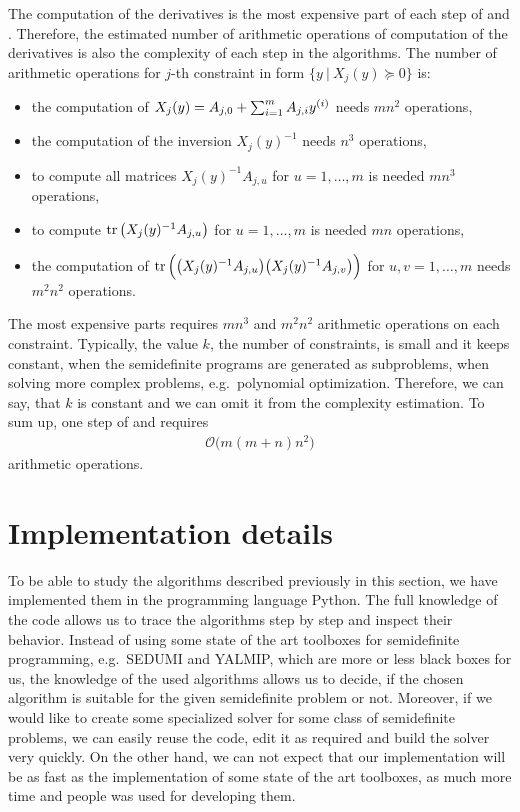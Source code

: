 The computation of the derivatives is the most expensive part of each step of  and .
Therefore, the estimated number of arithmetic operations of computation of the derivatives is also the complexity of each step in the algorithms.
The number of arithmetic operations for $j$-th constraint in form $\big\{y\ |\ X_j(y) \succeq 0\big\}$ is:
\begin{itemize}
  \item the computation of $X_j(y) = A_{j,0} + \sum_{i=1}^mA_{j,i}y^{(i)}$ needs $mn^2$ operations,
  \item the computation of the inversion $X_j(y)^{-1}$ needs $n^3$ operations,
  \item to compute all matrices $X_j(y)^{-1}A_{j,u}$ for $u = 1,\ldots,m$ is needed $mn^3$ operations,
  \item to compute $\operatorname{tr}\big(X_j(y)^{-1}A_{j,u}\big)$ for $u = 1,\ldots,m$ is needed $mn$ operations,
  \item the computation of $\operatorname{tr}\Big(\big(X_j(y)^{-1}A_{j,u}\big)\big(X_j(y)^{-1}A_{j,v}\big)\Big)$ for $u, v = 1,\ldots, m$ needs $m^2n^2$ operations.
\end{itemize}
The most expensive parts requires $mn^3$ and $m^2n^2$ arithmetic operations on each constraint.
Typically, the value $k$, the number of constraints, is small and it keeps constant, when the semidefinite programs are generated as subproblems, when solving more complex problems, e.g.\ polynomial optimization. Therefore, we can say, that $k$ is constant and we can omit it from the complexity estimation.
To sum up, one step of  and  requires
\begin{eqnarray}
  \mathcal{O}\big(m(m+n)n^2\big)
\end{eqnarray}
arithmetic operations.

\section{Implementation details}
To be able to study the algorithms described previously in this section, we have implemented them in the programming language Python\cite{python}.
The full knowledge of the code allows us to trace the algorithms step by step and inspect their behavior.
Instead of using some state of the art toolboxes for semidefinite programming, e.g.\ SEDUMI\cite{sedumi} and YALMIP\cite{yalmip}, which are more or less black boxes for us, the knowledge of the used algorithms allows us to decide, if the chosen algorithm is suitable for the given semidefinite problem or not.
Moreover, if we would like to create some specialized solver for some class of semidefinite problems, we can easily reuse the code, edit it as required and build the solver very quickly.
On the other hand, we can not expect that our implementation will be as fast as the implementation of some state of the art toolboxes, as much more time and people was used for developing them.

